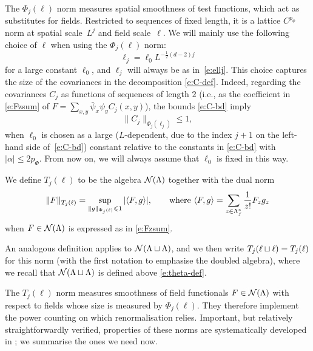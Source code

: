 \documentclass[11pt]{amsart}
\numberwithin{equation}{section}
\numberwithin{theorem}{section}
\newcommand{\1}{{\bf 1}}
\begin{document}
The $\Phi_j(\ell)$ norm measures spatial smoothness of test functions,
which act as substitutes for fields.  Restricted to sequences of fixed
length, it is a lattice $C^{p_\Phi}$ norm at spatial scale~$L^j$ and
field scale~$\ell$.  We will mainly use the following choice of $\ell$
when using the $\Phi_j(\ell)$ norm:
\begin{equation}
  \label{e:ellj}
  \ell_j = \ell_0 L^{-\frac12(d-2)j}
\end{equation}
for a large constant $\ell_0$, and $\ell_{j}$ will always be as in~\eqref{e:ellj}.
This choice captures the size of the covariances in the decomposition \eqref{e:C-def}.
Indeed, regarding the covariances $C_{j}$ as functions of sequences of length $2$
(i.e., as the coefficient in \eqref{e:Fzsum} of $F= \sum_{x,y} \bar\psi_{x}\psi_{y}C_{j}(x,y)$),
the bounds \eqref{e:C-bd} imply
\begin{equation} \label{e:Cleq1}
  \|C_{j}\|_{\Phi_j(\ell_j)} \leq 1,
\end{equation}
when $\ell_0$ is chosen as a large ($L$-dependent, due to the
index $j+1$ on the left-hand side of~\eqref{e:C-bd}) constant relative
to the constants in  \eqref{e:C-bd} with $|\alpha|\leq 2p_\Phi$.
From now on, we will always assume that $\ell_0$ is fixed in this way. 


\begin{definition} \label{def:Tphi}
 We define $T_j(\ell)$ to be the algebra $ \mathcal N(\Lambda)$ together with the dual norm
 \begin{equation} \label{e:Tphi-def}
   \|F\|_{T_j(\ell)} = \sup_{\|g\|_{\Phi_j(\ell)} \leqslant 1}| \langle F,g \rangle|
   ,
   \qquad \text{where }
   \langle F,g \rangle = \sum_{z \in \Lambda_f^*}  \frac{1}{z!} F_z g_z
 \end{equation}
 when $F\in \mathcal N(\Lambda)$ is expressed as in \eqref{e:Fzsum}.
 
 An analogous definition applies to $\mathcal N(\Lambda \sqcup \Lambda)$, and we
 then write $T_j(\ell \sqcup \ell) = T_j(\ell)$ for this norm
 (with the first notation to emphasise the doubled algebra),
 where we recall that $\mathcal N(\Lambda\sqcup\Lambda)$ is defined above \eqref{e:theta-def}.
\end{definition}

The $T_j(\ell)$ norm measures smoothness of field functionals $F\in \mathcal N(\Lambda)$ 
with respect to fields whose size is measured by $\Phi_j(\ell)$.
They therefore implement the power counting on which renormalisation relies.
%
Important, but relatively straightforwardly verified, properties of these norms are systematically developed in \cite{MR3332938}; we summarise the ones we need now.
%
\end{document}
